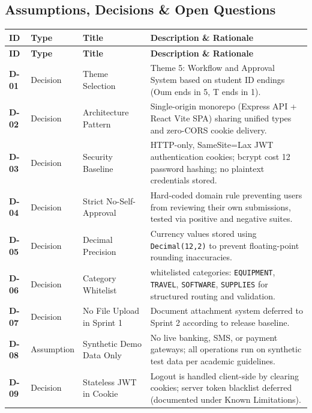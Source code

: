 \documentclass[11pt,a4paper]{article}
\begin{document}
\subsection{Assumptions, Decisions \& Open Questions}

\vspace{0.3em}
\begin{longtable}{|>{\RaggedRight}p{1.4cm}|>{\centering\arraybackslash}p{2.0cm}|>{\RaggedRight}p{3.8cm}|>{\RaggedRight}p{7.5cm}|}
\hline
\rowcolor{zenPale}\textbf{ID} & \textbf{Type} & \textbf{Title} & \textbf{Description \& Rationale} \\ \hline
\endfirsthead
\hline
\rowcolor{zenPale}\textbf{ID} & \textbf{Type} & \textbf{Title} & \textbf{Description \& Rationale} \\ \hline
\endhead
\hline
\endfoot
\textbf{D-01} & Decision & Theme Selection & Theme 5: Workflow and Approval System based on student ID endings (Oum ends in 5, T ends in 1). \\ \hline
\textbf{D-02} & Decision & Architecture Pattern & Single-origin monorepo (Express API + React Vite SPA) sharing unified types and zero-CORS cookie delivery. \\ \hline
\textbf{D-03} & Decision & Security Baseline & HTTP-only, SameSite=Lax JWT authentication cookies; bcrypt cost 12 password hashing; no plaintext credentials stored. \\ \hline
\textbf{D-04} & Decision & Strict No-Self-Approval & Hard-coded domain rule preventing users from reviewing their own submissions, tested via positive and negative suites. \\ \hline
\textbf{D-05} & Decision & Decimal Precision & Currency values stored using \texttt{Decimal(12,2)} to prevent floating-point rounding inaccuracies. \\ \hline
\textbf{D-06} & Decision & Category Whitelist & 4 whitelisted categories: \texttt{EQUIPMENT}, \texttt{TRAVEL}, \texttt{SOFTWARE}, \texttt{SUPPLIES} for structured routing and validation. \\ \hline
\textbf{D-07} & Decision & No File Upload in Sprint 1 & Document attachment system deferred to Sprint 2 according to release baseline. \\ \hline
\textbf{D-08} & Assumption & Synthetic Demo Data Only & No live banking, SMS, or payment gateways; all operations run on synthetic test data per academic guidelines. \\ \hline
\textbf{D-09} & Decision & Stateless JWT in Cookie & Logout is handled client-side by clearing cookies; server token blacklist deferred (documented under Known Limitations). \\ \hline

\end{longtable}
\end{document}
